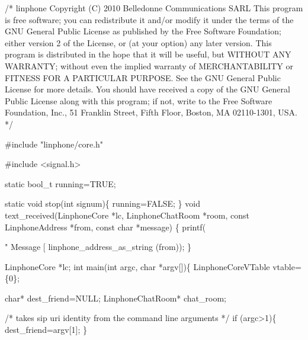 \begin{DoxyCodeInclude}

\textcolor{comment}{/*}
\textcolor{comment}{linphone}
\textcolor{comment}{Copyright (C) 2010  Belledonne Communications SARL}
\textcolor{comment}{}
\textcolor{comment}{This program is free software; you can redistribute it and/or}
\textcolor{comment}{modify it under the terms of the GNU General Public License}
\textcolor{comment}{as published by the Free Software Foundation; either version 2}
\textcolor{comment}{of the License, or (at your option) any later version.}
\textcolor{comment}{}
\textcolor{comment}{This program is distributed in the hope that it will be useful,}
\textcolor{comment}{but WITHOUT ANY WARRANTY; without even the implied warranty of}
\textcolor{comment}{MERCHANTABILITY or FITNESS FOR A PARTICULAR PURPOSE.  See the}
\textcolor{comment}{GNU General Public License for more details.}
\textcolor{comment}{}
\textcolor{comment}{You should have received a copy of the GNU General Public License}
\textcolor{comment}{along with this program; if not, write to the Free Software}
\textcolor{comment}{Foundation, Inc., 51 Franklin Street, Fifth Floor, Boston, MA  02110-1301, USA.}
\textcolor{comment}{*/}

\textcolor{preprocessor}{#include "linphone/core.h"}

\textcolor{preprocessor}{#include <signal.h>}

\textcolor{keyword}{static} bool\_t running=TRUE;

\textcolor{keyword}{static} \textcolor{keywordtype}{void} stop(\textcolor{keywordtype}{int} signum)\{
        running=FALSE;
\}
\textcolor{keywordtype}{void} text\_received(LinphoneCore *lc, LinphoneChatRoom *room, \textcolor{keyword}{const} 
      LinphoneAddress *from, \textcolor{keyword}{const} \textcolor{keywordtype}{char} *message) \{
        printf(\textcolor{stringliteral}{" Message [%
      linphone_address_as_string (from));
\}


LinphoneCore *lc;
\textcolor{keywordtype}{int} main(\textcolor{keywordtype}{int} argc, \textcolor{keywordtype}{char} *argv[])\{
        LinphoneCoreVTable vtable=\{0\};

        \textcolor{keywordtype}{char}* dest\_friend=NULL;
        LinphoneChatRoom* chat\_room;

        \textcolor{comment}{/* takes   sip uri  identity from the command line arguments */}
        \textcolor{keywordflow}{if} (argc>1)\{
                dest\_friend=argv[1];
        \}

}
\end{DoxyCodeInclude}
